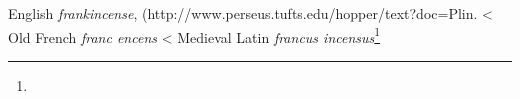 \begin{etymology}\label{ety:frankincense}
English \textit{frankincense}, (http://www.perseus.tufts.edu/hopper/text?doc=Plin.%
< Old French \textit{franc encens}
< Medieval Latin \textit{francus incensus}\footnote{}
\end{etymology}